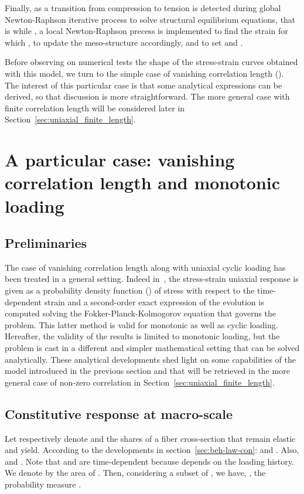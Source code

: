 \documentclass[12p]{amsart}
\begin{document}
Finally, as a transition from compression to tension is detected during global Newton-Raphson iterative process to solve structural equilibrium equations, that is  while , a local Newton-Raphson precess is implemented to find the strain  for which , to update the meso-structure accordingly, and to set  and .

Before observing on numerical tests the shape of the stress-strain curves obtained with this model, we turn to the simple case of vanishing correlation length (). The interest of this particular case is that some analytical expressions can be derived, so that discussion is more straightforward. The more general case with finite correlation length will be considered later in Section~\ref{sec:uniaxial_finite_length}.
\section{A particular case: vanishing correlation length and monotonic loading}\label{sec:VanishingCorrelationLength}

\subsection{Preliminaries}

The case of vanishing correlation length along with uniaxial cyclic loading has been treated in a general setting. Indeed in~\cite{Jeremic2007}, the stress-strain uniaxial response is given as a probability density function () of stress with respect to the time-dependent strain and a second-order exact expression of the  evolution is computed solving the Fokker-Planck-Kolmogorov equation that governs the problem. This latter method is valid for monotonic as well as cyclic loading. Hereafter, the validity of the results is limited to monotonic loading, but the problem is cast in a different and simpler mathematical setting that can be solved analytically. These analytical developments shed light on some capabilities of the model introduced in the previous section and that will be retrieved in the more general case of non-zero correlation in Section~\ref{sec:uniaxial_finite_length}.


\subsection{Constitutive response at macro-scale}

Let respectively denote  and  the shares of a fiber cross-section that remain elastic and yield. According to the developments in section~\ref{sec:beh-law-con}:  and . Also,  and . Note that  and  are time-dependent because  depends on the loading history. We denote by  the area of . Then, considering a subset  of , we have, , the probability measure .
\end{document}
